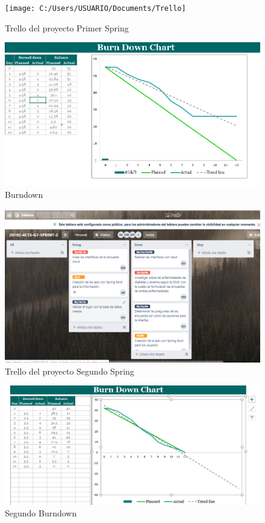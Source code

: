 \begin{figure}
	\centering
	\texttt{[image: C:/Users/USUARIO/Documents/Trello]}
	\caption[Figura 1]{Trello del proyecto Primer Spring}
	\label{fig:trello}
\end{figure}

\begin{figure}
	\centering
	\includegraphics[width=1.2\linewidth]{img/Burndown}
	\caption[Figura 2]{Burndown}
	\label{fig:burndown}
\end{figure}

\begin{figure}
	\centering
	\includegraphics[width=1.1\linewidth]{img/Spring2}
	\caption[Figura 3]{Trello del proyecto Segundo Spring}
	\label{fig:spring2}
\end{figure}
\begin{figure}
	\centering
	\includegraphics[width=1.2\linewidth]{img/Burdown2}
	\caption[Figura 4]{Segundo Burndown}
	\label{fig:burdown2}
\end{figure}





